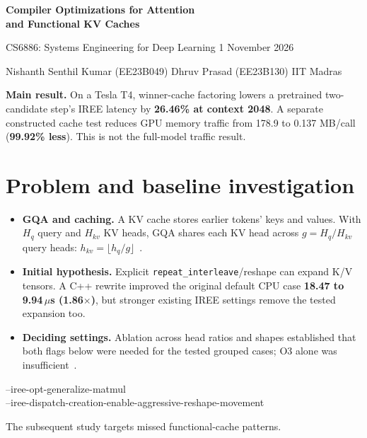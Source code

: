 \documentclass[10pt,a4paper]{article}
\newcommand{\code}[1]{\texttt{#1}}
\newcommand{\smallnote}[1]{{\footnotesize #1\par}}
\newcommand{\projectauthors}{Nishanth Senthil Kumar (EE23B049) \quad Dhruv Prasad (EE23B130) \quad IIT Madras}
\begin{document}
\thispagestyle{plain}
{\LARGE\bfseries Compiler Optimizations for Attention\\[2pt]and Functional KV Caches\par}
{\small CS6886: Systems Engineering for Deep Learning \hfill 1 November 2026\par}
{\small\projectauthors\par}
\vspace{2pt}
\begin{resultbox}
\textbf{Main result.} On a Tesla T4, winner-cache factoring lowers a pretrained two-candidate step's IREE latency by \textbf{26.46\% at context 2048}. A separate constructed cache test reduces GPU memory traffic from 178.9 to 0.137 MB/call (\textbf{99.92\% less}). This is not the full-model traffic result.
\end{resultbox}

\section{Problem and baseline investigation}
\begin{itemize}
\item \textbf{GQA and caching.} A KV cache stores earlier tokens' keys and values. With $H_q$ query and $H_{kv}$ KV heads, GQA shares each KV head across $g=H_q/H_{kv}$ query heads: $h_{kv}=\lfloor h_q/g\rfloor$~\cite{gqa,mqa}.
\item \textbf{Initial hypothesis.} Explicit \code{repeat\_interleave}/reshape can expand K/V tensors. A C++ rewrite improved the original default CPU case \textbf{18.47 to 9.94\,$\mu$s (1.86$\times$)}, but stronger existing IREE settings remove the tested expansion too.
\item \textbf{Deciding settings.} Ablation across head ratios and shapes established that both flags below were needed for the tested grouped cases; O3 alone was insufficient~\cite{ireesource,project}.
\end{itemize}
{\footnotesize\ttfamily
--iree-opt-generalize-matmul\\
--iree-dispatch-creation-enable-aggressive-reshape-movement\par}
\smallnote{The subsequent study targets missed functional-cache patterns.}
\end{document}
